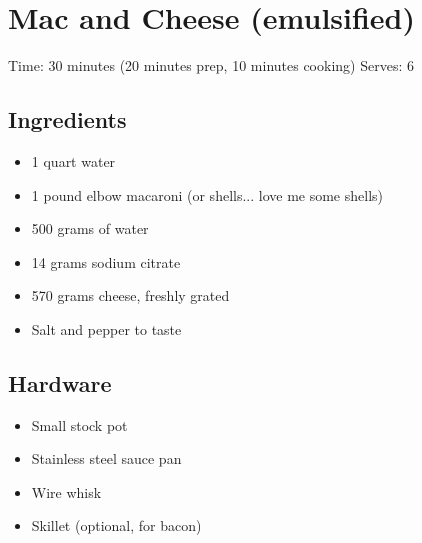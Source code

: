 \section{Mac and Cheese (emulsified)}
\label{macAndCheeseEmulsified}
\setcounter{secnumdepth}{0}
Time: 30 minutes (20 minutes prep, 10 minutes cooking)
Serves: 6

\begin{multicols}{2}
\subsection*{Ingredients}
\begin{itemize}
    \item 1 quart water
    \item 1 pound elbow macaroni (or shells... love me some shells)
    \item 500 grams of water
    \item 14 grams sodium citrate
    \item 570 grams cheese, freshly grated
    \item Salt and pepper to taste
\end{itemize}

\subsection*{Hardware}
\begin{itemize}
    \item Small stock pot
    \item Stainless steel sauce pan
    \item Wire whisk
    \item Skillet (optional, for bacon)
\end{itemize}
\clearpage


\end{multicols}
